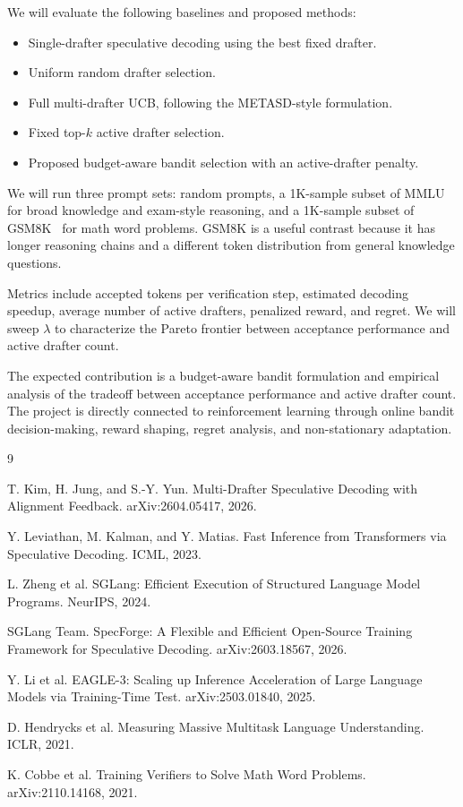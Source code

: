 \documentclass[11pt]{article}
\begin{document}
We will evaluate the following baselines and proposed methods:
\begin{itemize}
    \item Single-drafter speculative decoding using the best fixed drafter.
    \item Uniform random drafter selection.
    \item Full multi-drafter UCB, following the METASD-style formulation.
    \item Fixed top-$k$ active drafter selection.
    \item Proposed budget-aware bandit selection with an active-drafter penalty.
\end{itemize}

We will run three prompt sets: random prompts, a 1K-sample subset of MMLU~\cite{mmlu} for broad knowledge and exam-style reasoning, and a 1K-sample subset of GSM8K~\cite{gsm8k} for math word problems. GSM8K is a useful contrast because it has longer reasoning chains and a different token distribution from general knowledge questions.

Metrics include accepted tokens per verification step, estimated decoding speedup, average number of active drafters, penalized reward, and regret. We will sweep $\lambda$ to characterize the Pareto frontier between acceptance performance and active drafter count.

The expected contribution is a budget-aware bandit formulation and empirical analysis of the tradeoff between acceptance performance and active drafter count. The project is directly connected to reinforcement learning through online bandit decision-making, reward shaping, regret analysis, and non-stationary adaptation.

\footnotesize
\begin{thebibliography}{9}

T. Kim, H. Jung, and S.-Y. Yun.
\newblock Multi-Drafter Speculative Decoding with Alignment Feedback.
\newblock arXiv:2604.05417, 2026.

Y. Leviathan, M. Kalman, and Y. Matias.
\newblock Fast Inference from Transformers via Speculative Decoding.
\newblock ICML, 2023.

L. Zheng et al.
\newblock SGLang: Efficient Execution of Structured Language Model Programs.
\newblock NeurIPS, 2024.

SGLang Team.
\newblock SpecForge: A Flexible and Efficient Open-Source Training Framework for Speculative Decoding.
\newblock arXiv:2603.18567, 2026.

Y. Li et al.
\newblock EAGLE-3: Scaling up Inference Acceleration of Large Language Models via Training-Time Test.
\newblock arXiv:2503.01840, 2025.

D. Hendrycks et al.
\newblock Measuring Massive Multitask Language Understanding.
\newblock ICLR, 2021.

K. Cobbe et al.
\newblock Training Verifiers to Solve Math Word Problems.
\newblock arXiv:2110.14168, 2021.

\end{thebibliography}
\end{document}
